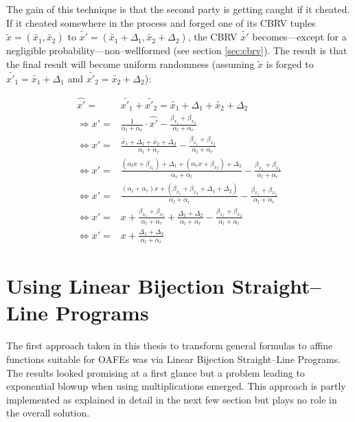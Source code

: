 \documentclass[12pt, a4paper]{article}
\begin{document}
The gain of this technique is that the second party is getting caught if it
cheated. If it cheated somewhere in the process and forged one of its CBRV
tuples $\widetilde{x} = (\widetilde{x_1}, \widetilde{x_2})$ to $\widetilde{x'} =
(\widetilde{x_1} + \Delta_1, \widetilde{x_2} + \Delta_2)$, the CBRV
$\widetilde{x'}$ becomes---except for a negligible probability---non--wellformed
(see section \ref{sec:cbrv}). The result is that the final
result will become uniform randomness (assuming $\widetilde{x}$ is forged to
$\widetilde{x'_1} = \widetilde{x_1} + \Delta_1$ and $\widetilde{x'_2} =
\widetilde{x_2} + \Delta_2$):

\begin{align*}
  \widehat{x'} = & \widetilde{x'_1} + \widetilde{x'_2} = \widetilde{x_1} +
  \Delta_1 + \widetilde{x_2} + \Delta_2 \\
  \Rightarrow x' = & \frac{1}{\alpha_l + \alpha_r} \cdot \widehat{x'} -
  \frac{\beta_{x_1} +
  \beta_{x_2}}{\alpha_l + \alpha_r} \\
  \Leftrightarrow x' = & \frac{\widetilde{x_1} + \Delta_1 +
  \widetilde{x_2} + \Delta_2}{\alpha_l + \alpha_r} -
  \frac{\beta_{x_1} +\beta_{x_2}}{\alpha_l + \alpha_r}\\
  \Leftrightarrow x' = & \frac{(\alpha_l x + \beta_{x_1}) + \Delta_1 +
  (\alpha_r x + \beta_{x_2}) + \Delta_2}{\alpha_r + \alpha_l} -
  \frac{\beta_{x_1} +\beta_{x_2}}{\alpha_l + \alpha_r} \\
  \Leftrightarrow x' = & \frac{(\alpha_l+\alpha_r)x + (\beta_{x_1}+\beta_{x_2} +
  \Delta_1+\Delta_2)}{\alpha_l+\alpha_r} -
  \frac{\beta_{x_1} +\beta_{x_2}}{\alpha_l + \alpha_r} \\
  \Leftrightarrow x' = & x + \frac{\beta_{x_1}+\beta_{x_2}}{\alpha_l+\alpha_r}
  + \frac{\Delta_1 + \Delta_2}{\alpha_l + \alpha_r} -
  \frac{\beta_{x_1}+\beta_{x_2}}{\alpha_l + \alpha_r} \\
  \Leftrightarrow x' = & x + \frac{\Delta_1 + \Delta_2}{\alpha_l + \alpha_r}
\end{align*}


\section{Using Linear Bijection Straight--Line Programs}
\label{sec:using-lbs}

The first approach taken in this thesis to transform general formulas to affine
functions suitable for OAFEs was via Linear Bijection Straight--Line Programs.
The results looked promising at a first glance but a problem leading to
exponential blowup when using multiplications emerged. This approach is partly
implemented as explained in detail in the next few section but plays no role in
the overall solution.
\end{document}
